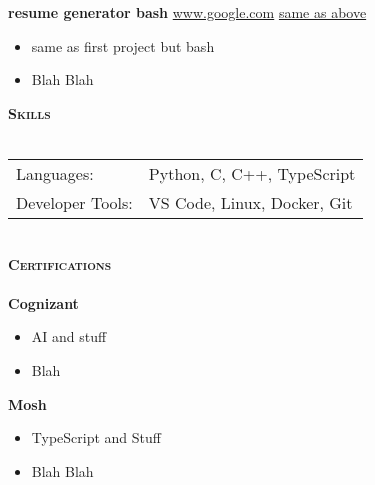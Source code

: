 \documentclass[a4paper]{article}
\newcommand{\lineunder} {
    \vspace*{-8pt} \\
    \hspace*{-18pt} \hrulefill \\
}
\newcommand{\header} [1] {
    {\hspace*{-18pt}\vspace*{6pt} \textsc{#1}}
    \vspace*{-6pt} \lineunder
}
\begin{document}
\textbf{resume generator bash} \vline \; \url{www.google.com}\; \vline \; \url{same as above}\\ 
\begin{itemize} \itemsep 0pt 
\item{same as first project but bash} 
\item{Blah Blah} 
\end{itemize} 
\header{\textbf{Skills}} 
\begin{tabular}{l l} 
Languages: & Python, C, C++, TypeScript \\ 
Developer Tools: & VS Code, Linux, Docker, Git \\ 
\end{tabular} \\ 
\header{\textbf{Certifications}} 
\textbf{Cognizant} 
\begin{itemize} \itemsep 0pt 
\item{AI and stuff} 
\item{Blah} 

 \end{itemize} 
\textbf{Mosh} 
\begin{itemize} \itemsep 0pt 
\item{TypeScript and Stuff} 
\item{Blah Blah} 

 \end{itemize} 
\end{document}
